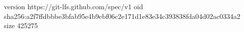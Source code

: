 version https://git-lfs.github.com/spec/v1
oid sha256:a2f7ffdbbbe3bfab95e4b9ebf06c2e171d1e83e34c393838fda04d02ac0334a2
size 425275
